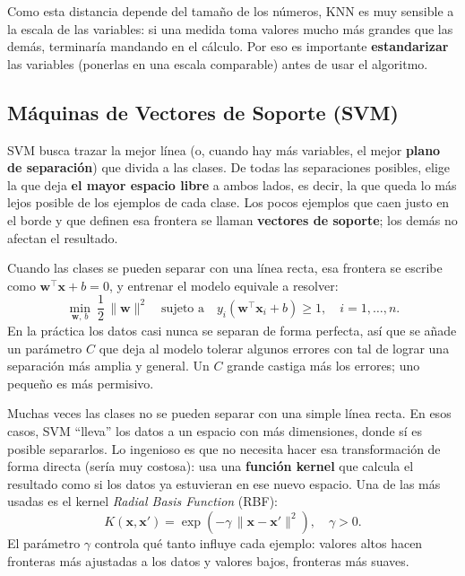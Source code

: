 \documentclass[11pt,letterpaper,twoside]{article}
\begin{document}
Como esta distancia depende del tamaño de los números, KNN es muy sensible a la escala de las variables: si una medida toma valores mucho más grandes que las demás, terminaría mandando en el cálculo. Por eso es importante \textbf{estandarizar} las variables (ponerlas en una escala comparable) antes de usar el algoritmo.

\subsection{Máquinas de Vectores de Soporte (SVM)}
SVM busca trazar la mejor línea (o, cuando hay más variables, el mejor \textbf{plano de separación}) que divida a las clases. De todas las separaciones posibles, elige la que deja \textbf{el mayor espacio libre} a ambos lados, es decir, la que queda lo más lejos posible de los ejemplos de cada clase. Los pocos ejemplos que caen justo en el borde y que definen esa frontera se llaman \textbf{vectores de soporte}; los demás no afectan el resultado.

Cuando las clases se pueden separar con una línea recta, esa frontera se escribe como $\mathbf{w}^\top \mathbf{x} + b = 0$, y entrenar el modelo equivale a resolver:
\begin{equation}
\min_{\mathbf{w},\,b}\ \frac{1}{2}\,\lVert \mathbf{w} \rVert^2
\quad \text{sujeto a} \quad
y_i\left(\mathbf{w}^\top \mathbf{x}_i + b\right) \ge 1, \quad i=1,\dots,n.
\label{eq:svm}
\end{equation}
En la práctica los datos casi nunca se separan de forma perfecta, así que se añade un parámetro $C$ que deja al modelo tolerar algunos errores con tal de lograr una separación más amplia y general. Un $C$ grande castiga más los errores; uno pequeño es más permisivo.

\begin{tecnica}
Muchas veces las clases no se pueden separar con una simple línea recta. En esos casos, SVM ``lleva'' los datos a un espacio con más dimensiones, donde sí es posible separarlos. Lo ingenioso es que no necesita hacer esa transformación de forma directa (sería muy costosa): usa una \textbf{función kernel} que calcula el resultado como si los datos ya estuvieran en ese nuevo espacio. Una de las más usadas es el kernel \textit{Radial Basis Function} (RBF):
\begin{equation}
K(\mathbf{x},\mathbf{x}') = \exp\!\left(-\gamma\,\lVert \mathbf{x}-\mathbf{x}' \rVert^2\right), \quad \gamma > 0.
\label{eq:rbf}
\end{equation}
El parámetro $\gamma$ controla qué tanto influye cada ejemplo: valores altos hacen fronteras más ajustadas a los datos y valores bajos, fronteras más suaves.
\end{tecnica}
\end{document}
